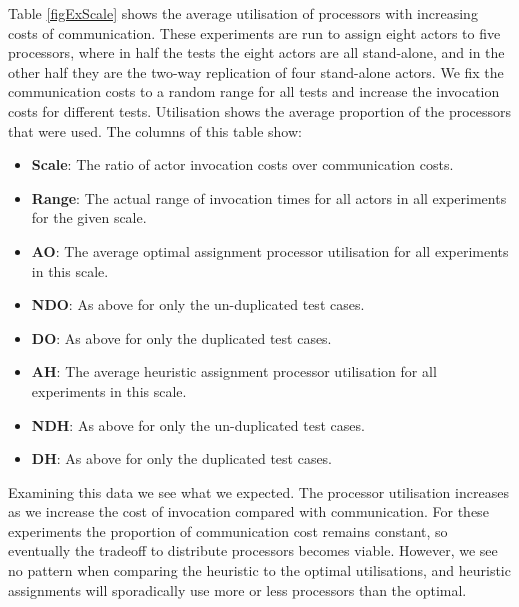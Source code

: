 Table \ref{figExScale} shows the average utilisation of processors with increasing costs of communication.
These experiments are run to assign eight actors to five processors, where in half the tests the eight actors are all stand-alone, and in the other half they are the two-way replication of four stand-alone actors.
We fix the communication costs to a random range for all tests and increase the invocation costs for different tests.
Utilisation shows the average proportion of the processors that were used.
The columns of this table show:
\begin{itemize}
	\item {\bf Scale}: The ratio of actor invocation costs over communication costs.
	\item {\bf Range}: The actual range of invocation times for all actors in all experiments for the given scale.
	\item {\bf AO}: The average optimal assignment processor utilisation for all experiments in this scale.
	\item {\bf NDO}: As above for only the un-duplicated test cases.
	\item {\bf DO}: As above for only the duplicated test cases.
	\item {\bf AH}: The average heuristic assignment processor utilisation for all experiments in this scale.
	\item {\bf NDH}: As above for only the un-duplicated test cases.
	\item {\bf DH}: As above for only the duplicated test cases.
\end{itemize}

Examining this data we see what we expected.
The processor utilisation increases as we increase the cost of invocation compared with communication.
For these experiments the proportion of communication cost remains constant, so eventually the tradeoff to distribute processors becomes viable.
However, we see no pattern when comparing the heuristic to the optimal utilisations, and heuristic assignments will sporadically use more or less processors than the optimal.

